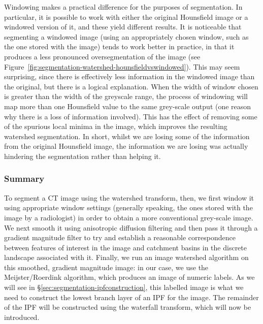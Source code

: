 Windowing makes a practical difference for the purposes of segmentation. In particular, it is possible to work with either the original Hounsfield image or a windowed version of it, and these yield different results. It is noticeable that segmenting a windowed image (using an appropriately chosen window, such as the one stored with the image) tends to work better in practice, in that it produces a less pronounced oversegmentation of the image (see Figure~\ref{fig:segmentation-watershed-hounsfieldvswindowed}). This may seem surprising, since there is effectively less information in the windowed image than the original, but there is a logical explanation. When the width of window chosen is greater than the width of the greyscale range, the process of windowing will map more than one Hounsfield value to the same grey-scale output (one reason why there is a loss of information involved). This has the effect of removing some of the spurious local minima in the image, which improves the resulting watershed segmentation. In short, whilst we are losing some of the information from the original Hounsfield image, the information we are losing was actually hindering the segmentation rather than helping it.

\subsubsection{Summary}

To segment a CT image using the watershed transform, then, we first window it using appropriate window settings (generally speaking, the ones stored with the image by a radiologist) in order to obtain a more conventional grey-scale image. We next smooth it using anisotropic diffusion filtering and then pass it through a gradient magnitude filter to try and establish a reasonable correspondence between features of interest in the image and catchment basins in the discrete landscape associated with it. Finally, we run an image watershed algorithm on this smoothed, gradient magnitude image: in our case, we use the Meijster/Roerdink algorithm, which produces an image of numeric labels. As we will see in \S\ref{sec:segmentation-ipfconstruction}, this labelled image is what we need to construct the lowest branch layer of an IPF for the image. The remainder of the IPF will be constructed using the waterfall transform, which will now be introduced.


